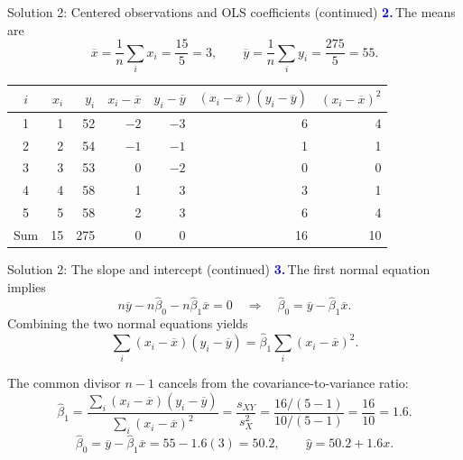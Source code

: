 \documentclass[notes,10pt, aspectratio=169]{beamer}
\newcommand{\answerpart}[1]{\textcolor{blue}{\textbf{#1.}}\,}
\begin{document}
\begin{frame}{Solution 2: Centered observations and OLS coefficients (continued)}
\small
\answerpart{2}The means are
\[
\overline x=\frac1n\sum_i x_i=\frac{15}{5}=3,
\qquad
\overline y=\frac1n\sum_i y_i=\frac{275}{5}=55.
\]
\begin{center}
\begin{tabular}{c|rr|rr|rr}
$i$ & $x_i$ & $y_i$ & $x_i-\overline x$ & $y_i-\overline y$ & $(x_i-\overline x)(y_i-\overline y)$ & $(x_i-\overline x)^2$ \\ \hline
1 & 1 & 52 & $-2$ & $-3$ & 6 & 4 \\
2 & 2 & 54 & $-1$ & $-1$ & 1 & 1 \\
3 & 3 & 53 & 0 & $-2$ & 0 & 0 \\
4 & 4 & 58 & 1 & 3 & 3 & 1 \\
5 & 5 & 58 & 2 & 3 & 6 & 4 \\ \hline
Sum & 15 & 275 & 0 & 0 & 16 & 10
\end{tabular}
\end{center}
\end{frame}

\begin{frame}{Solution 2: The slope and intercept (continued)}
\small
\answerpart{3}The first normal equation implies
\[
n\overline y-n\widehat\beta_0-n\widehat\beta_1\overline x=0
\quad\Longrightarrow\quad
\boxed{\widehat\beta_0=\overline y-\widehat\beta_1\overline x}.
\]
Combining the two normal equations yields
\[
\sum_i(x_i-\overline x)(y_i-\overline y)
=\widehat\beta_1\sum_i(x_i-\overline x)^2.
\]

The common divisor $n-1$ cancels from the covariance-to-variance ratio:
\[
\widehat\beta_1
=\frac{\sum_i(x_i-\overline x)(y_i-\overline y)}{\sum_i(x_i-\overline x)^2}
=\frac{s_{XY}}{s_X^2}
=\frac{16/(5-1)}{10/(5-1)}=\frac{16}{10}=\boxed{1.6}.
\]
\[
\widehat\beta_0=\overline y-\widehat\beta_1\overline x
=55-1.6(3)=\boxed{50.2},\qquad \widehat y=50.2+1.6x.
\]
\end{frame}
\fi
\end{document}
